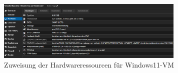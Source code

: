 \documentclass[12pt]{scrreprt}
\begin{document}
\begin{thebibliography}{99}
\begin{figure}[htbp]
	\centering
	\includegraphics[width=0.8\textwidth]{win11-hardware.png}
	\caption{Zuweisung der Hardwareressourcen für Windows11-VM}
	\label{fig:win11-hardware} %
\end{figure}


	\end{thebibliography}
	\newpage
	
\end{document}
